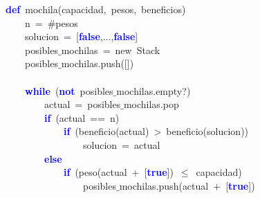 \noindent
\mbox{}\textbf{\textcolor{Blue}{def}}\ mochila\textcolor{BrickRed}{(}capacidad\textcolor{BrickRed}{,}\ pesos\textcolor{BrickRed}{,}\ beneficios\textcolor{BrickRed}{)} \\
\mbox{}\ \ \ \ n\ \textcolor{BrickRed}{=}\ \#pesos \\
\mbox{}\ \ \ \ solucion\ \textcolor{BrickRed}{=}\ \textcolor{BrickRed}{[}\textbf{\textcolor{Blue}{false}}\textcolor{BrickRed}{,}$\dots$\textcolor{BrickRed}{,}\textbf{\textcolor{Blue}{false}}\textcolor{BrickRed}{]} \\
\mbox{}\ \ \ \ posibles$\_$mochilas\ \textcolor{BrickRed}{=}\ new\ Stack\\
\mbox{}\ \ \ \ posibles$\_$mochilas\textcolor{BrickRed}{.}push\textcolor{BrickRed}{([])} \\
\mbox{}\ \ \ \  \\
\mbox{}\ \ \ \ \textbf{\textcolor{Blue}{while}}\ \textcolor{BrickRed}{(}\textbf{\textcolor{Blue}{not}}\ posibles$\_$mochilas\textcolor{BrickRed}{.}empty?\textcolor{BrickRed}{)} \\
\mbox{}\ \ \ \ \ \ \ \ actual\ \textcolor{BrickRed}{=}\ posibles$\_$mochilas\textcolor{BrickRed}{.}pop \\
\mbox{}\ \ \ \ \ \ \ \ \textbf{\textcolor{Blue}{if}}\ \textcolor{BrickRed}{(}actual\ \textcolor{BrickRed}{==}\ n\textcolor{BrickRed}{)} \\
\mbox{}\ \ \ \ \ \ \ \ \ \ \ \ \textbf{\textcolor{Blue}{if}}\ \textcolor{BrickRed}{(}beneficio\textcolor{BrickRed}{(}actual\textcolor{BrickRed}{)}\ \textcolor{BrickRed}{\textgreater{}}\ beneficio\textcolor{BrickRed}{(}solucion\textcolor{BrickRed}{))} \\
\mbox{}\ \ \ \ \ \ \ \ \ \ \ \ \ \ \ \ solucion\ \textcolor{BrickRed}{=}\ actual \\
\mbox{}\ \ \ \ \ \ \ \ \textbf{\textcolor{Blue}{else}} \\
\mbox{}\ \ \ \ \ \ \ \ \ \ \ \ \textbf{\textcolor{Blue}{if}}\ \textcolor{BrickRed}{(}peso\textcolor{BrickRed}{(}actual\ \textcolor{BrickRed}{+}\ \textcolor{BrickRed}{[}\textbf{\textcolor{Blue}{true}}\textcolor{BrickRed}{])}\ \textcolor{BrickRed}{$\le$}\ capacidad\textcolor{BrickRed}{)} \\
\mbox{}\ \ \ \ \ \ \ \ \ \ \ \ \ \ \ \ posibles$\_$mochilas\textcolor{BrickRed}{.}push\textcolor{BrickRed}{(}actual\ \textcolor{BrickRed}{+}\ \textcolor{BrickRed}{[}\textbf{\textcolor{Blue}{true}}\textcolor{BrickRed}{])} \\
